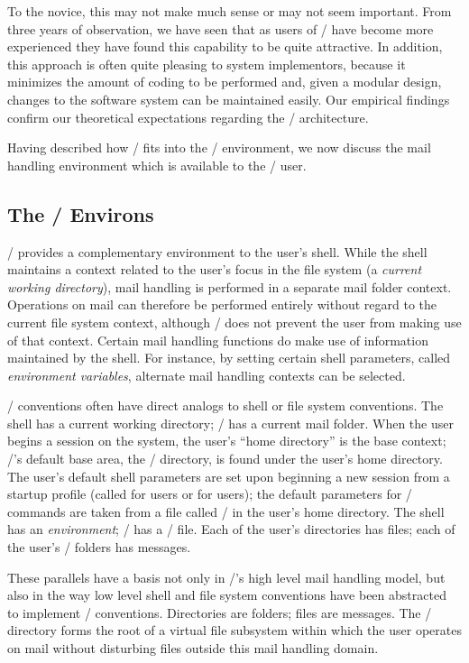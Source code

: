 To the novice,
this may not make much sense or may not seem important.
From three years of observation, we have seen that
as users of \MH/ have become more experienced
they have found this capability to be quite attractive.
In addition,
this approach is often quite pleasing to system implementors,
because it minimizes the amount of coding to be performed
and,
given a modular design,
changes to the software system can be maintained easily.
Our empirical findings confirm our theoretical expectations regarding the
\MH/ architecture.

Having described how \MH/ fits into the \unix/ environment,
we now discuss the mail handling environment which is available to the \MH/
user.

\subsection{The \MH/ Environs}			%
\MH/ provides a complementary environment to the user's shell.
While the shell maintains a context related to the user's focus in the file
system (a {\it current working directory\/}),
mail handling is performed in a separate mail folder context.
Operations on mail can therefore be
performed entirely without regard to the current file system context,
although \MH/ does not prevent the user from making use of that context.
Certain mail handling functions do make use of information
maintained by the shell.
For instance, by setting certain shell parameters,
called {\it environment variables},
alternate mail handling contexts can be selected.

\MH/ conventions often have direct analogs to shell or file system
conventions.
The shell has a current working directory; \MH/ has a current mail folder.
When the user begins a session on the system,
the user's ``home directory'' is the base context;
\MH/'s default base area, the \Mail/ directory, 
is found under the user's home directory.
The user's default shell parameters are set upon beginning a new
session from a startup profile
(called  for  users
or  for  users);
the default parameters for \MH/ commands are taken from a file called
\profile/ in the user's home directory.
The shell has an {\it environment\/};
\MH/ has a \context/ file.
Each of the user's directories has files;
each of the user's \MH/ folders has messages.

These parallels have a basis not only in \MH/'s high level mail
handling model,
but also in the way low level shell and file
system conventions have been abstracted to implement \MH/ conventions.
Directories are folders; files are messages.
The \Mail/ directory forms the root of a virtual file subsystem within
which the user operates on mail without disturbing files outside this
mail handling domain. 


